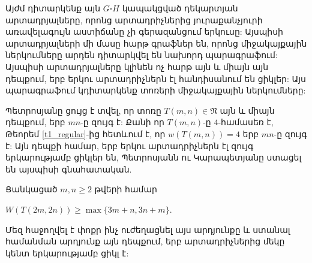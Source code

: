 Այժմ դիտարկենք այն $G \square H$ կապակցված դեկարտյան արտադրյալները, որոնց արտադրիչներից յուրաքանչյուրի առավելագույն աստիճանը չի գերազանցում երկուսը: Այսպիսի արտադրյալների մի մասը հարթ գրաֆներ են, որոնց միջակայքային ներկումները արդեն դիտարկվել են նախորդ պարագրաֆում: Այսպիսի արտադրյալները կլինեն ոչ հարթ այն և միայն այն դեպքում, երբ երկու արտադրիչներն էլ հանդիսանում են ցիկլեր: Այս պարագրաֆում կդիտարկենք տոռերի միջակայքային ներկումները:

Պետրոսյանը \cite{Petrosyan2011} ցույց է տվել, որ տոռը $T(m,n)\in\mathfrak{N}$ այն և միայն դեպքում, երբ $mn$-ը զույգ է: Քանի որ $T(m,n)$-ը $4$-համասեռ է, Թեորեմ \ref{t1_regular}-ից հետևում է, որ $w(T(m,n))=4$ երբ $mn$-ը զույգ է: Այն դեպքի համար, երբ երկու արտադրիչներն էլ զույգ երկարությամբ ցիկլեր են, Պետրոսյանն ու Կարապետյանը \cite{PetrosyanKarapetyan2007} ստացել են այսպիսի գնահատական.

\begin{theorem}
\label{t2_torus_W_eveneven} Ցանկացած $m,n \geq 2$ թվերի համար
\begin{center}
$W(T(2m,2n))\geq \max\{3m+n,3n+m\}$.
\end{center}
\end{theorem}

Մեզ հաջողվել է փոքր ինչ ուժեղացնել այս արդյունքը և ստանալ համանման արդյունք այն դեպքում, երբ արտադրիչներից մեկը կենտ երկարությամբ ցիկլ է:

